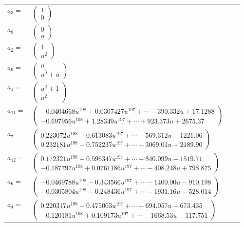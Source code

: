 \documentclass[1p]{elsarticle_modified}
\theoremstyle{definition}
\begin{document}
\begin{tabular}{m{7pt} m{180pt} m{7pt} m{180pt} }
\flushright $a_{3}=$&$\begin{pmatrix}1\\0\end{pmatrix}$ \\
\flushright $a_{8}=$&$\begin{pmatrix}0\\u\end{pmatrix}$ \\
\flushright $a_{2}=$&$\begin{pmatrix}1\\u^2\end{pmatrix}$ \\
\flushright $a_{9}=$&$\begin{pmatrix}u\\u^3+u\end{pmatrix}$ \\
\flushright $a_{1}=$&$\begin{pmatrix}u^2+1\\u^2\end{pmatrix}$ \\
\flushright $a_{11}=$&$\begin{pmatrix}-0.0404668 u^{198}+0.0307427 u^{197}+\cdots-390.332 u+17.1288\\-0.697956 u^{198}+1.28349 u^{197}+\cdots+923.373 u+2675.37\end{pmatrix}$ \\
\flushright $a_{7}=$&$\begin{pmatrix}0.223072 u^{198}-0.613083 u^{197}+\cdots-569.312 u-1221.06\\0.232181 u^{198}-0.752237 u^{197}+\cdots-3069.01 u-2189.90\end{pmatrix}$ \\
\flushright $a_{12}=$&$\begin{pmatrix}0.172321 u^{198}-0.596347 u^{197}+\cdots-840.099 u-1519.71\\-0.187797 u^{198}+0.0761186 u^{197}+\cdots-408.248 u+798.875\end{pmatrix}$ \\
\flushright $a_{6}=$&$\begin{pmatrix}-0.0469788 u^{198}-0.343566 u^{197}+\cdots-1400.00 u-910.198\\-0.0305804 u^{198}-0.248436 u^{197}+\cdots-1931.16 u-528.014\end{pmatrix}$ \\
\flushright $a_{4}=$&$\begin{pmatrix}0.220317 u^{198}-0.475003 u^{197}+\cdots-694.057 u-673.435\\-0.120181 u^{198}+0.109173 u^{197}+\cdots-1668.53 u-117.751\end{pmatrix}$ \\

\end{tabular}
\end{document}
